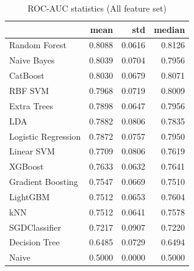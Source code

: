 \begin{table}
\caption{ROC-AUC statistics (All feature set)}
\label{tab:roc-auc_All_stats}
\begin{tabular}{lrrr}
\toprule
 & mean & std & median \\
\midrule
Random Forest & 0.8088 & 0.0616 & 0.8126 \\
Naive Bayes & 0.8039 & 0.0704 & 0.7956 \\
CatBoost & 0.8030 & 0.0679 & 0.8071 \\
RBF SVM & 0.7968 & 0.0719 & 0.8009 \\
Extra Trees & 0.7898 & 0.0647 & 0.7956 \\
LDA & 0.7882 & 0.0806 & 0.7835 \\
Logistic Regression & 0.7872 & 0.0757 & 0.7950 \\
Linear SVM & 0.7709 & 0.0806 & 0.7619 \\
XGBoost & 0.7633 & 0.0632 & 0.7641 \\
Gradient Boosting & 0.7547 & 0.0669 & 0.7510 \\
LightGBM & 0.7512 & 0.0653 & 0.7604 \\
kNN & 0.7512 & 0.0641 & 0.7578 \\
SGDClassifier & 0.7217 & 0.0907 & 0.7220 \\
Decision Tree & 0.6485 & 0.0729 & 0.6494 \\
Naive & 0.5000 & 0.0000 & 0.5000 \\
\bottomrule
\end{tabular}
\end{table}
